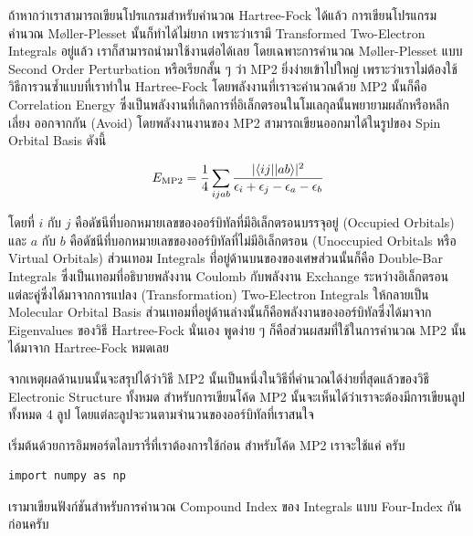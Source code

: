 ถ้าหากว่าเราสามารถเขียนโปรแกรมสำหรับคำนวณ Hartree-Fock ได้แล้ว การเขียนโปรแกรมคำนวณ M\o{}ller-Plesset นั้นก็ทำได้ไม่ยาก
เพราะว่าเรามี Transformed Two-Electron Integrals อยู่แล้ว เราก็สามารถนำมาใช้งานต่อได้เลย โดยเฉพาะการคำนวณ M\o{}ller-Plesset
แบบ Second Order Perturbation หรือเรียกสั้น ๆ ว่า MP2 ยิ่งง่ายเข้าไปใหญ่ เพราะว่าเราไม่ต้องใช้วิธีการวนซ้ำแบบที่เราทำใน Hartree-Fock
โดยพลังงานที่เราจะคำนวณด้วย MP2 นั้นก็คือ Correlation Energy ซึ่งเป็นพลังงานที่เกิดการที่อิเล็กตรอนในโมเลกุลนั้นพยายามผลักหรือหลีกเลี่ยง%
ออกจากกัน (Avoid) โดยพลังงานงานของ MP2 สามารถเขียนออกมาได้ในรูปของ Spin Orbital Basis ดังนี้

\begin{equation}
  E_{\rm MP2}
  =
  \frac{1}{4}
  \sum_{ijab}
  \frac{
    \vert \langle ij \vert \vert ab \rangle\vert ^2
  }{
    \epsilon_i+\epsilon_j-\epsilon_a-\epsilon_b
  }
\end{equation}

\noindent โดยที่ $i$ กับ $j$ คือดัชนีที่บอกหมายเลขของออร์บิทัลที่มีอิเล็กตรอนบรรจุอยู่ (Occupied Orbitals) และ $a$ กับ $b$
คือดัชนีที่บอกหมายเลขของออร์บิทัลที่ไม่มีอิเล็กตรอน (Unoccupied Orbitals หรือ Virtual Orbitals) ส่วนเทอม Integrals
ที่อยู่ด้านบนของของเศษส่วนนั้นก็คือ Double-Bar Integrals ซึ่งเป็นเทอมที่อธิบายพลังงาน Coulomb กับพลังงาน Exchange
ระหว่างอิเล็กตรอนแต่ละคู่ซึ่งได้มาจากการแปลง (Transformation) Two-Electron Integrals ให้กลายเป็น Molecular Orbital Basis
ส่วนเทอมที่อยู่ด้านล่างนั้นก็คือพลังงานของออร์บิทัลซึ่งได้มาจาก Eigenvalues ของวิธี Hartree-Fock นั่นเอง พูดง่าย ๆ ก็คือส่วนผสมที่ใช้ในการคำนวณ
MP2 นั้นได้มาจาก Hartree-Fock หมดเลย

จากเหตุผลด้านบนนั้นจะสรุปได้ว่าวิธี MP2 นั้นเป็นหนึ่งในวิธีที่คำนวณได้ง่ายที่สุดแล้วของวิธี Electronic Structure ทั้งหมด สำหรับการเขียนโค้ด
MP2 นั้นจะเห็นได้ว่าเราจะต้องมีการเขียนลูปทั้งหมด 4 ลูป โดยแต่ละลูปจะวนตามจำนวนของออร์บิทัลที่เราสนใจ

\vspace{5pt}

\noindent เริ่มต้นด้วยการอิมพอร์ตไลบรารี่ที่เราต้องการใช้ก่อน สำหรับโค้ด MP2 เราจะใช้แค่  ครับ

\vspace{5pt}

\begin{lstlisting}[style=MyPython]
import numpy as np
\end{lstlisting}

\vspace{5pt}

\noindent เรามาเขียนฟังก์ชันสำหรับการคำนวณ Compound Index ของ Integrals แบบ Four-Index กันก่อนครับ

